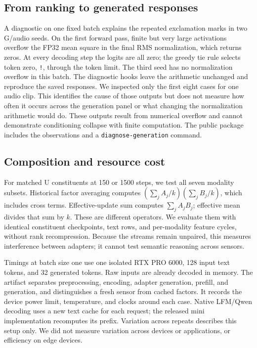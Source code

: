 \documentclass[11pt]{article}
\begin{document}
\FloatBarrier
\subsection{From ranking to generated responses}


\FloatBarrier


A diagnostic on one fixed batch explains the repeated exclamation marks in
two G/audio seeds. On the first forward pass, finite but very large activations
overflow the FP32 mean square in the final RMS normalization, which returns
zeros. At every decoding step the logits are all zero; the greedy tie rule
selects token zero, \texttt{!}, through the token limit. The third seed has no
normalization overflow in this batch. The diagnostic hooks leave the arithmetic
unchanged and reproduce the saved responses. We inspected only the first eight
cases for one audio clip. This identifies the cause of those outputs but does
not measure how often it occurs across the generation panel or what changing
the normalization arithmetic would do. These outputs result from numerical
overflow and cannot demonstrate conditioning collapse with finite computation.
The public package includes the observations and a
\texttt{diagnose-generation} command.


\FloatBarrier
\subsection{Composition and resource cost}
\label{sec:cost}
For matched U constituents at 150 or 1500 steps, we test all seven modality
subsets. Historical factor averaging computes
$(\sum_j A_j/k)(\sum_j B_j/k)$, which includes cross terms. Effective-update sum
computes $\sum_j A_jB_j$; effective mean divides that sum by $k$. These are
different operators. We evaluate them with identical constituent checkpoints,
text rows, and per-modality feature cycles, without rank recompression. Because
the streams remain unpaired, this measures interference between adapters;
it cannot test semantic reasoning across sensors.




Timings at batch size one use one isolated RTX PRO 6000, 128 input text tokens, and
32 generated tokens. Raw inputs are already decoded in memory. The artifact
separates preprocessing, encoding, adapter generation, prefill, and generation,
and distinguishes a fresh sensor from cached factors. It records the device
power limit, temperature, and clocks around each case. Native LFM/Qwen decoding
uses a new text cache for each request; the released mini implementation
recomputes its prefix. Variation across repeats describes this setup only.
We did not measure variation across devices or applications, or efficiency
on edge devices.
\end{document}
